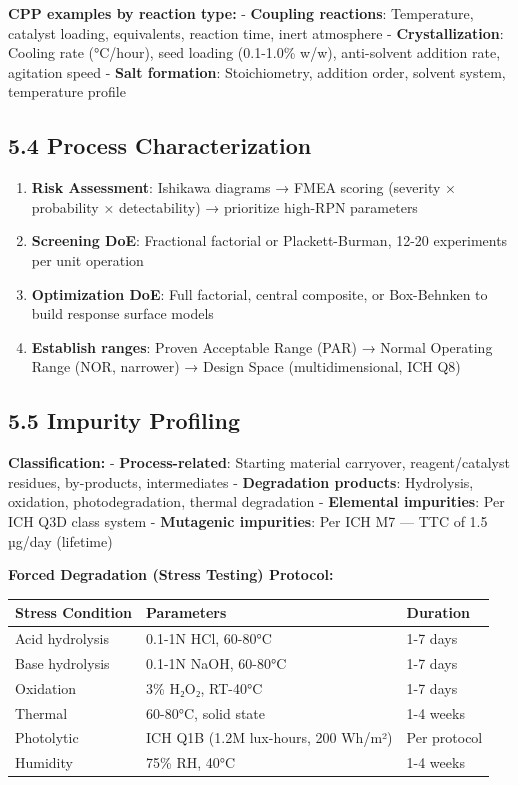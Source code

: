 \documentclass[
  11pt,
  a4paper,
]{report}
\providecommand{\tightlist}{%
  \setlength{\itemsep}{0pt}\setlength{\parskip}{0pt}}
\begin{document}
\textbf{CPP examples by reaction type:} - \textbf{Coupling reactions}:
Temperature, catalyst loading, equivalents, reaction time, inert
atmosphere - \textbf{Crystallization}: Cooling rate (°C/hour), seed
loading (0.1-1.0\% w/w), anti-solvent addition rate, agitation speed -
\textbf{Salt formation}: Stoichiometry, addition order, solvent system,
temperature profile

\hypertarget{process-characterization}{%
\subsection{5.4 Process
Characterization}\label{process-characterization}}

\begin{enumerate}
\def\labelenumi{\arabic{enumi}.}
\tightlist
\item
  \textbf{Risk Assessment}: Ishikawa diagrams → FMEA scoring (severity ×
  probability × detectability) → prioritize high-RPN parameters
\item
  \textbf{Screening DoE}: Fractional factorial or Plackett-Burman, 12-20
  experiments per unit operation
\item
  \textbf{Optimization DoE}: Full factorial, central composite, or
  Box-Behnken to build response surface models
\item
  \textbf{Establish ranges}: Proven Acceptable Range (PAR) → Normal
  Operating Range (NOR, narrower) → Design Space (multidimensional, ICH
  Q8)
\end{enumerate}

\hypertarget{impurity-profiling}{%
\subsection{5.5 Impurity Profiling}\label{impurity-profiling}}

\textbf{Classification:} - \textbf{Process-related}: Starting material
carryover, reagent/catalyst residues, by-products, intermediates -
\textbf{Degradation products}: Hydrolysis, oxidation, photodegradation,
thermal degradation - \textbf{Elemental impurities}: Per ICH Q3D class
system - \textbf{Mutagenic impurities}: Per ICH M7 --- TTC of 1.5 µg/day
(lifetime)

\textbf{Forced Degradation (Stress Testing) Protocol:}

\begin{longtable}[]{@{}lll@{}}
\toprule
Stress Condition & Parameters & Duration\tabularnewline
\midrule
\endhead
Acid hydrolysis & 0.1-1N HCl, 60-80°C & 1-7 days\tabularnewline
Base hydrolysis & 0.1-1N NaOH, 60-80°C & 1-7 days\tabularnewline
Oxidation & 3\% H₂O₂, RT-40°C & 1-7 days\tabularnewline
Thermal & 60-80°C, solid state & 1-4 weeks\tabularnewline
Photolytic & ICH Q1B (1.2M lux-hours, 200 Wh/m²) & Per
protocol\tabularnewline
Humidity & 75\% RH, 40°C & 1-4 weeks\tabularnewline
\bottomrule
\end{longtable}
\end{document}
